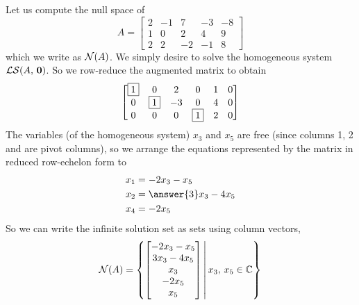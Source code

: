 \documentclass{ximera}
\begin{document}
\begin{example}
  Let us compute the null space of
  \[
    A=\begin{bmatrix}
      2 & -1 & 7 & -3 & -8 \\
      1 & 0 & 2 & 4 & 9 \\
      2 & 2 & -2 & -1 & 8
    \end{bmatrix}
  \]
  which we write as $\mathcal{N}\!\left(A\right)$.  We simply desire to solve the
  homogeneous system $\mathcal{LS}\!\left(A,\,\mathbf{0}\right)$.  So we row-reduce the augmented
  matrix to obtain
  \[
    \begin{bmatrix}
      \fbox{1} & 0 & 2 & 0 & 1 & 0 \\
      0 & \fbox{1} & -3 & 0 & 4 & 0 \\
      0 & 0 & 0 & \fbox{1} & 2 & 0
    \end{bmatrix}
  \]
  The variables (of the homogeneous system) $x_3$ and $x_5$ are free
  (since columns 1, 2 and  are pivot columns), so we arrange
  the equations represented by the matrix in reduced row-echelon form
  to
  \begin{align*}
    x_1&=-2x_3-x_5\\
    x_2&=\answer{3}x_3-4x_5\\
    x_4&=-2x_5\\
  \end{align*}
  So we can write the infinite solution set as sets using column vectors,
  \[
    \mathcal{N}\!\left(A\right)=\left\lbrace
      \begin{bmatrix}-2x_3-x_5\\3x_3-4x_5\\x_3\\-2x_5\\x_5\end{bmatrix}
    \,\middle|\,
      x_3,\,x_5\in\mathbb{C}
    \right\rbrace
  \]
\end{example}
\end{document}
